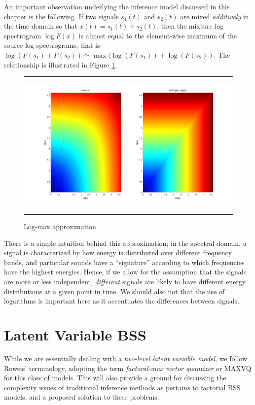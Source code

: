 \documentclass[11pt, oneside, a4paper]{report}
\begin{document}
An important observation underlying the inference model discussed in this chapter is the following.
If two signals $s_1(t)$ and $s_2(t)$ are mixed \emph{additively} in the time domain so that 
$x(t) = s_1(t) + s_2(t)$, then the mixture log spectrogram $\log F(x)$ is almost equal to the 
element-wise maximum of the source log spectrograms, that is 
$\log (F(s_1) + F(s_2)) \simeq \max(\log (F(s_1)) + \log (F(s_2))$. The relationship is illustrated in Figure
\ref{logmax_fig}.

\begin{figure}[h!]
  \centering
  \hrule
  \includegraphics[width = .9\textwidth]{Figures/logmax}
  \hrule
  \label{logmax_fig}
  \caption{Log-max approximation.}
\end{figure}

There is a simple intuition behind this approximation; in the spectral domain, a signal is characterized
by how energy is distributed over different frequency bands, and particular sounds have a ``signature''
according to which frequencies have the highest energies. Hence, if we allow for the assumption that
the signals are more or less independent, \emph{different} signals are likely to have different energy 
distributions at a given point in time. We should also not that the use of logarithms is important here as 
it accentuates the differences between signals.


\section{Latent Variable BSS}\label{latent_bss}

While we are essentially dealing with a \emph{two-level latent variable model}, we follow
Roweis' terminology, adopting the term \emph{factoral-max vector quantizer} or MAXVQ for 
this class of models. This will also provide a ground for discussing the complexity issues
of traditional inference methods as pertains to factorial BSS models, and a proposed solution
to these problems.
\end{document}
